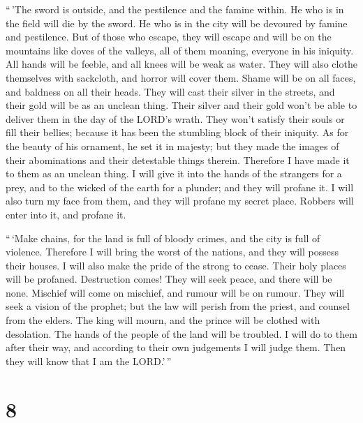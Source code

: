  ``\,'The sword is outside, and the pestilence and the
famine within. He who is in the field will die by the sword. He who is
in the city will be devoured by famine and pestilence.  But
of those who escape, they will escape and will be on the mountains like
doves of the valleys, all of them moaning, everyone in his iniquity.
 All hands will be feeble, and all knees will be weak as
water.  They will also clothe themselves with sackcloth,
and horror will cover them. Shame will be on all faces, and baldness on
all their heads.  They will cast their silver in the
streets, and their gold will be as an unclean thing. Their silver and
their gold won't be able to deliver them in the day of the LORD's wrath.
They won't satisfy their souls or fill their bellies; because it has
been the stumbling block of their iniquity.  As for the
beauty of his ornament, he set it in majesty; but they made the images
of their abominations and their detestable things therein. Therefore I
have made it to them as an unclean thing.  I will give it
into the hands of the strangers for a prey, and to the wicked of the
earth for a plunder; and they will profane it.  I will also
turn my face from them, and they will profane my secret place. Robbers
will enter into it, and profane it.

 ``\,`Make chains, for the land is full of bloody crimes,
and the city is full of violence.  Therefore I will bring
the worst of the nations, and they will possess their houses. I will
also make the pride of the strong to cease. Their holy places will be
profaned.  Destruction comes! They will seek peace, and
there will be none.  Mischief will come on mischief, and
rumour will be on rumour. They will seek a vision of the prophet; but
the law will perish from the priest, and counsel from the elders.
 The king will mourn, and the prince will be clothed with
desolation. The hands of the people of the land will be troubled. I will
do to them after their way, and according to their own judgements I will
judge them. Then they will know that I am the LORD.'\,''

\hypertarget{section-6}{%
\section{8}\label{section-6}}

